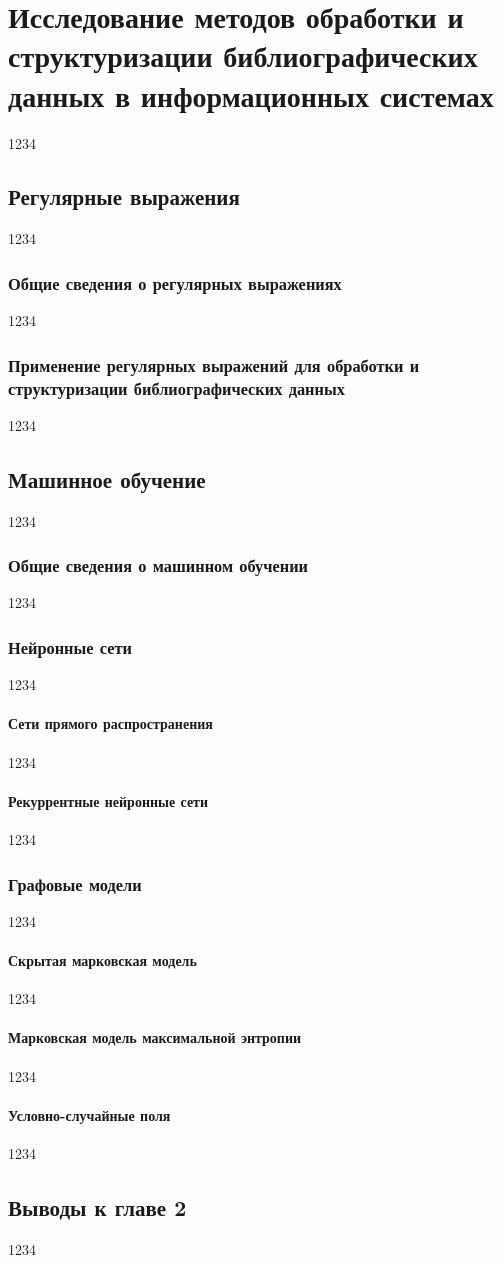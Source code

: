 \chapter{Исследование методов обработки и структуризации библиографических данных в информационных системах}
1234
\section{Регулярные выражения}
1234
\subsection{Общие сведения о регулярных выражениях}
1234
\subsection{Применение регулярных выражений для обработки и структуризации библиографических данных}
1234
\section{Машинное обучение}
1234
\subsection{Общие сведения о машинном обучении}
1234
\subsection{Нейронные сети}
1234
\subsubsection{Сети прямого распространения}
1234
\subsubsection{Рекуррентные нейронные сети}
1234
\subsection{Графовые модели}
1234
\subsubsection{Скрытая марковская модель}
1234
\subsubsection{Марковская модель максимальной энтропии}
1234
\subsubsection{Условно-случайные поля}
1234
\section*{Выводы к главе 2}
1234